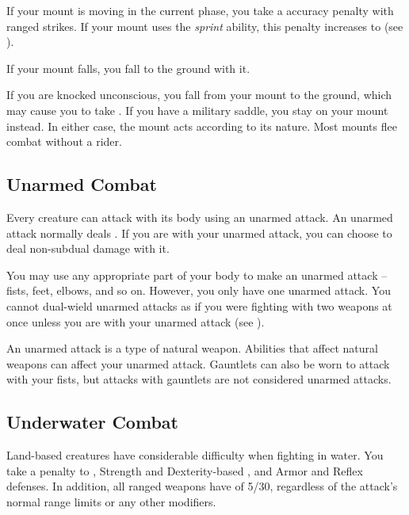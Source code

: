         If your mount is moving in the current phase, you take a  accuracy penalty with ranged strikes.
        If your mount uses the \textit{sprint} ability, this penalty increases to  (see ).

         If your mount falls, you fall to the ground with it.

         If you are knocked unconscious, you fall from your mount to the ground, which may cause you to take .
        If you have a military saddle, you stay on your mount instead.
        In either case, the mount acts according to its nature.
        Most mounts flee combat without a rider.

    \subsection{Unarmed Combat}\label{Unarmed Combat}
        Every creature can attack with its body using an unarmed attack.
        An unarmed attack normally deals .
        If you are  with your unarmed attack, you can choose to deal non-subdual damage with it.

        You may use any appropriate part of your body to make an unarmed attack -- fists, feet, elbows, and so on.
        However, you only have one unarmed attack.
        You cannot dual-wield unarmed attacks as if you were fighting with two weapons at once unless you are  with your unarmed attack (see ).

        An unarmed attack is a type of natural weapon.
        Abilities that affect natural weapons can affect your unarmed attack.
        Gauntlets can also be worn to attack with your fists, but attacks with gauntlets are not considered unarmed attacks.

    \subsection{Underwater Combat}\label{Underwater Combat}
        Land-based creatures have considerable difficulty when fighting in water.
        You take a  penalty to , Strength and Dexterity-based , and Armor and Reflex defenses.
        In addition, all ranged weapons have  of 5/30, regardless of the attack's normal range limits or any other modifiers.

